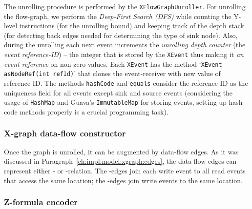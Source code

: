The unrolling procedure is performed by the \texttt{XFlowGraphUnroller}. %
For unrolling the flow-graph, we perform the \textit{Deep-First Search (DFS)} while counting the Y-level instructions (for the unrolling bound) and keeping track of the depth stack (for detecting back edges needed for determining the type of sink node).
Also, during the unrolling each next event increments the \textit{unrolling depth counter} (the \textit{event reference-ID}) -- the integer that is stored by the \texttt{XEvent} thus making it \textit{an event reference} on non-zero values.
Each \texttt{XEvent} has the method `\texttt{XEvent asNodeRef(int refId)}' that clones the event-receiver with new value of reference-ID.
The methods \texttt{hashCode} and \texttt{equals} consider the reference-ID as the uniqueness field for all events except sink and source events (considering the usage of \texttt{HashMap} and Guava's \texttt{ImmutableMap} for storing events, setting up hash-code methods properly is a crucial programming task).




\subsubsection{X-graph data-flow constructor}
\label{ch:impl:proc:x-df}

Once the graph is unrolled, it can be augmented by data-flow edges.
As it was discussed in Paragraph~\ref{ch:impl:model:xgraph:edges}, the data-flow edges can represent either \rf{}- or \co{}-relation.
The \rf{}-edges join each write event to all read events that access the same location; the \co{}-edges join write events to the same location.



\subsubsection{Z-formula encoder}
\label{ch:impl:proc:z-encoder}

